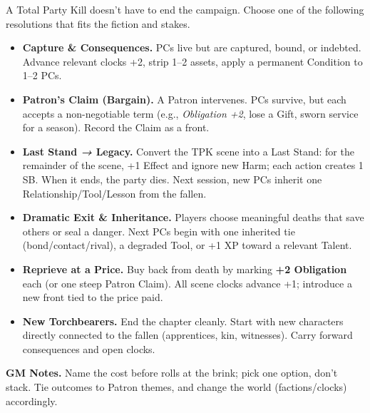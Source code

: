 \begin{fatebox}
  A Total Party Kill doesn’t have to end the campaign. Choose one of the following resolutions that fits the fiction and stakes.
  
  \begin{itemize}
    \item \textbf{Capture \& Consequences.} PCs live but are captured, bound, or indebted. Advance relevant clocks +2, strip 1–2 assets, apply a permanent Condition to 1–2 PCs.
  
    \item \textbf{Patron’s Claim (Bargain).} A Patron intervenes. PCs survive, but each accepts a non-negotiable term (e.g., \emph{Obligation +2}, lose a Gift, sworn service for a season). Record the Claim as a front.
  
    \item \textbf{Last Stand \emph{→} Legacy.} Convert the TPK scene into a Last Stand: for the remainder of the scene, +1 Effect and ignore new Harm; each action creates 1 SB. When it ends, the party dies. Next session, new PCs inherit one Relationship/Tool/Lesson from the fallen.
  
    \item \textbf{Dramatic Exit \& Inheritance.} Players choose meaningful deaths that save others or seal a danger. Next PCs begin with one inherited tie (bond/contact/rival), a degraded Tool, or +1 XP toward a relevant Talent.
  
    \item \textbf{Reprieve at a Price.} Buy back from death by marking \textbf{+2 Obligation} each (or one steep Patron Claim). All scene clocks advance +1; introduce a new front tied to the price paid.
  
    \item \textbf{New Torchbearers.} End the chapter cleanly. Start with new characters directly connected to the fallen (apprentices, kin, witnesses). Carry forward consequences and open clocks.
  \end{itemize}
  
  \textbf{GM Notes.} Name the cost before rolls at the brink; pick one option, don’t stack. Tie outcomes to Patron themes, and change the world (factions/clocks) accordingly.
  \end{fatebox}